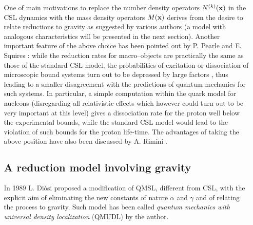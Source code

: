 \documentclass[10pt,a4paper]{article}
\begin{document}
One of main motivations to replace the number density operators
$N^{(k)}({\bf x})$ in the CSL dynamics with the mass density
operators $M({\bf x})$ derives from the desire to relate
reductions to gravity as suggested by various authors
\cite{kar,kom,pen1,emn,di2,fre} (a model with analogous
characteristics will be presented in the next section). Another
important feature of the above choice has been pointed out by P.
Pearle and E. Squires \cite{pes}: while the reduction rates for
macro--objects are practically the same as those of the standard
CSL model, the probabilities of excitation or dissociation of
microscopic bound systems turn out to be depressed by large
factors \cite{pes,bggg}, thus leading to a smaller disagreement
with the predictions of quantum mechanics for such systems. In
particular, a simple computation within the quark model for
nucleons (disregarding all relativistic effects which however
could turn out to be very important at this level) gives a
dissociation rate for the proton well below the experimental
bounds, while  the standard CSL model would lead to the violation of
such  bounds for the proton life-time. The advantages of taking the above
position have also been discussed by A. Rimini \cite{rimg}.


\subsection{A reduction model involving gravity} \label{sec8}

In 1989 L. Di\`osi \cite{di2} proposed a modification of QMSL,
different from CSL, with the explicit aim of eliminating the new
constants of nature $\alpha$ and $\gamma$ and of relating the
process to gravity. Such model has been called {\it quantum
mechanics with universal density localization} (QMUDL) by the
author.
\end{document}
